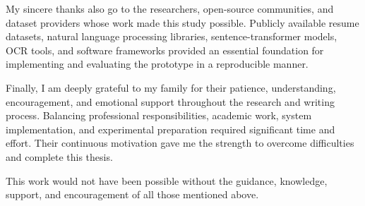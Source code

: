 \documentclass[12pt,a4paper,oneside]{report}
\begin{document}
My sincere thanks also go to the researchers, open-source communities, and dataset providers whose work made this study possible. Publicly available resume datasets, natural language processing libraries, sentence-transformer models, OCR tools, and software frameworks provided an essential foundation for implementing and evaluating the prototype in a reproducible manner.

Finally, I am deeply grateful to my family for their patience, understanding, encouragement, and emotional support throughout the research and writing process. Balancing professional responsibilities, academic work, system implementation, and experimental preparation required significant time and effort. Their continuous motivation gave me the strength to overcome difficulties and complete this thesis.

This work would not have been possible without the guidance, knowledge, support, and encouragement of all those mentioned above.
\end{document}
